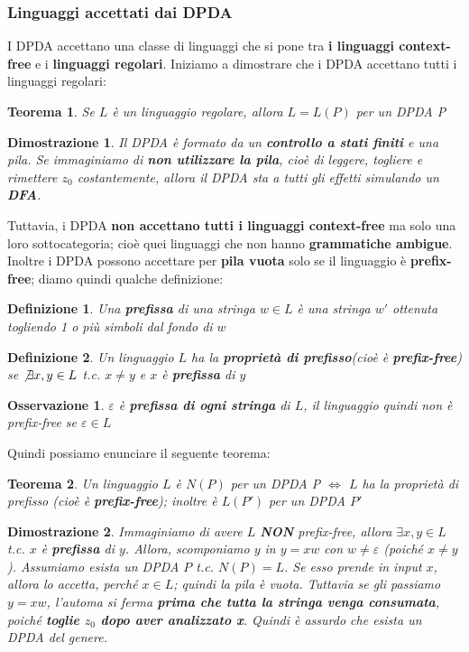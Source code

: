 \documentclass[12pt]{article}
\newtheorem{Definizione}{Definizione}[subsection]
\newtheorem{Teorema}{Teorema}[subsection]
\newtheorem{Dimostrazione}{Dimostrazione}[subsection]
\newtheorem{Osservazione}{Osservazione}[subsection]
\begin{document}
\subsubsection{Linguaggi accettati dai DPDA}
I DPDA accettano una classe di linguaggi che si pone tra \textbf{i linguaggi context-free} e i \textbf{linguaggi regolari}. Iniziamo a dimostrare che i DPDA accettano tutti i linguaggi regolari:
\begin{Teorema}
    Se $L$ è un linguaggio regolare, allora $L = L(P)$ per un DPDA P
\end{Teorema}
\begin{Dimostrazione}
    Il DPDA è formato da un \textbf{controllo a stati finiti} e una pila. Se immaginiamo di \textbf{non utilizzare la pila}, cioè di leggere, togliere e rimettere $z_0$ costantemente, allora il DPDA sta a tutti gli effetti simulando un \textbf{DFA}.
\end{Dimostrazione}
Tuttavia, i DPDA \textbf{non accettano tutti i linguaggi context-free} ma solo una loro sottocategoria; cioè quei linguaggi che non hanno \textbf{grammatiche ambigue}. Inoltre i DPDA possono accettare per \textbf{pila vuota} solo se il linguaggio è \textbf{prefix-free}; diamo quindi qualche definizione:
\begin{Definizione}
    Una \textbf{prefissa} di una stringa $w \in L$ è una stringa $w'$ ottenuta togliendo 1 o più simboli dal fondo di $w$
\end{Definizione}
\begin{Definizione}
    Un linguaggio $L$ ha la \textbf{proprietà di prefisso}(cioè è \textbf{prefix-free}) se $\not\exists x, y \in L$ t.c. $x \neq y$ e $x$ è \textbf{prefissa} di $y$
\end{Definizione}
\begin{Osservazione}
    $\varepsilon$ è \textbf{prefissa di ogni stringa} di $L$, il linguaggio quindi non è prefix-free se $\varepsilon \in L$
\end{Osservazione}
Quindi possiamo enunciare il seguente teorema:
\begin{Teorema}
    Un linguaggio $L$ è $N(P)$ per un DPDA P $\Leftrightarrow$ $L$ ha la proprietà di prefisso (cioè è \textbf{prefix-free}); inoltre è $L(P')$ per un DPDA $P'$
\end{Teorema}
\begin{Dimostrazione}
    Immaginiamo di avere $L$ \textbf{NON} prefix-free, allora $\exists x,y \in L$ t.c. $x$ è \textbf{prefissa} di $y$. Allora, scomponiamo $y$ in $y = xw$ con $w \neq \varepsilon$ (poiché $x \neq y$). Assumiamo esista un DPDA $P$ t.c. $N(P) = L$. Se esso prende in input $x$, allora lo accetta, perché $x \in L$; quindi la pila è vuota. Tuttavia se gli passiamo $y = xw$, l'automa si ferma \textbf{prima che tutta la stringa venga consumata}, poiché \textbf{toglie $z_0$ dopo aver analizzato x}. Quindi è assurdo che esista un DPDA del genere.
\end{Dimostrazione}
\end{document}
